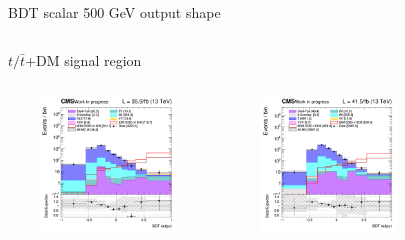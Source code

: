 \documentclass[8pt]{beamer}
\begin{document}
\begin{frame}{BDT scalar 500 GeV output shape}
\begin{columns}
\begin{column}{1.09\textwidth}
\begin{block}{\centering $t/\bar t$+DM signal region}\end{block} \vspace{10pt}
\end{column}
\end{columns} \vspace{-24pt}
\begin{columns}
		\begin{column}{0.33\textwidth}
			\begin{center}
			\begin{block}{}\end{block}	
     			\includegraphics[width=1.0\textwidth, height=100pt]{figs/2016/SmearSR-ttDM-scalar500/log_cratio_ST_topCR_ll_BDT_ttDM500_ST_BDT_output_scalar500_customBinsAttempt7.png}
    		\end{center}		
		\end{column} 
		\begin{column}{0.33\textwidth}
			\begin{center}
			\begin{block}{}\end{block}	
     			\includegraphics[width=1.0\textwidth, height=100pt]{figs/2017/SmearSR-ttDM-scalar500/log_cratio_ST_topCR_ll_BDT_ttDM500_ST_BDT_output_scalar500_customBinsAttempt7.png}
    		\end{center}		
		\end{column} 
		\begin{column}{0.33\textwidth}
			\begin{center}

\end{center}
\end{column}
\end{columns}
\end{frame}
\end{document}
